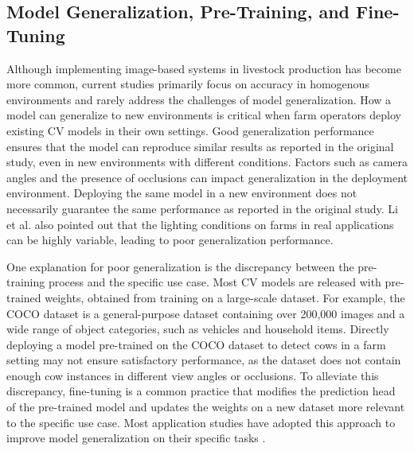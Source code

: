 \subsection{Model Generalization, Pre-Training, and Fine-Tuning}
Although implementing image-based systems in livestock production has become more common, current studies primarily focus on accuracy in homogenous environments and rarely address the challenges of model generalization. How a model can generalize to new environments is critical when farm operators deploy existing CV models in their own settings. Good generalization performance ensures that the model can reproduce similar results as reported in the original study, even in new environments with different conditions. Factors such as camera angles and the presence of occlusions can impact generalization in the deployment environment. Deploying the same model in a new environment does not necessarily guarantee the same performance as reported in the original study. Li et al. \cite{li2021practices} also pointed out that the lighting conditions on farms in real applications can be highly variable, leading to poor generalization performance.

One explanation for poor generalization is the discrepancy between the pre-training process and the specific use case. Most CV models are released with pre-trained weights, obtained from training on a large-scale dataset. For example, the COCO dataset \cite{lin2014microsoft} is a general-purpose dataset containing over 200,000 images and a wide range of object categories, such as vehicles and household items. Directly deploying a model pre-trained on the COCO dataset to detect cows in a farm setting may not ensure satisfactory performance, as the dataset does not contain enough cow instances in different view angles or occlusions. To alleviate this discrepancy, fine-tuning is a common practice that modifies the prediction head of the pre-trained model and updates the weights on a new dataset more relevant to the specific use case. Most application studies have adopted this approach to improve model generalization on their specific tasks \cite{han2021pre,guirguis2022cfa,gupta2023novel}.

